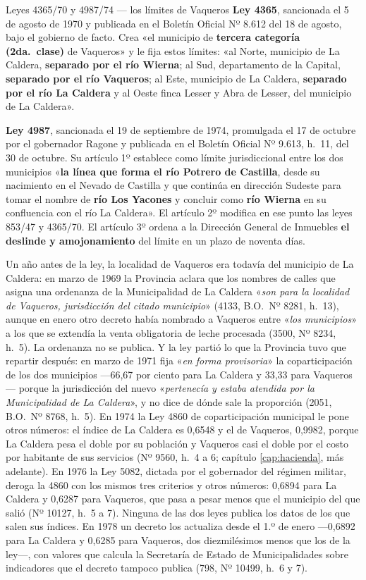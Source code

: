 \begin{ficha}{Leyes 4365/70 y 4987/74 --- los límites de Vaqueros}
\textbf{Ley 4365}, sancionada el 5 de agosto de 1970 y publicada en el Boletín Oficial Nº 8.612 del 18 de agosto, bajo el gobierno de facto. Crea «el municipio de \textbf{tercera categoría (2da.\ clase)} de Vaqueros» y le fija estos límites: «al Norte, municipio de La Caldera, \textbf{separado por el río Wierna}; al Sud, departamento de la Capital, \textbf{separado por el río Vaqueros}; al Este, municipio de La Caldera, \textbf{separado por el río La Caldera} y al Oeste finca Lesser y Abra de Lesser, del municipio de La Caldera».

\textbf{Ley 4987}, sancionada el 19 de septiembre de 1974, promulgada el 17 de octubre por el gobernador Ragone y publicada en el Boletín Oficial Nº 9.613, h.\ 11, del 30 de octubre. Su artículo 1º establece como límite jurisdiccional entre los dos municipios «\textbf{la línea que forma el río Potrero de Castilla}, desde su nacimiento en el Nevado de Castilla y que continúa en dirección Sudeste para tomar el nombre de \textbf{río Los Yacones} y concluir como \textbf{río Wierna} en su confluencia con el río La Caldera». El artículo 2º modifica en ese punto las leyes 853/47 y 4365/70. El artículo 3º ordena a la Dirección General de Inmuebles \textbf{el deslinde y amojonamiento} del límite en un plazo de noventa días.
\end{ficha}

Un año antes de la ley, la localidad de Vaqueros era todavía del municipio de La Caldera: en marzo de 1969 la Provincia aclara que los nombres de calles que asigna una ordenanza de la Municipalidad de La Caldera «\textit{son para la localidad de Vaqueros, jurisdicción del citado municipio}» (4133, B.O.\ Nº 8281, h.\ 13), aunque en enero otro decreto había nombrado a Vaqueros entre «\textit{los municipios}» a los que se extendía la venta obligatoria de leche procesada (3500, Nº 8234, h.\ 5). La ordenanza no se publica. Y la ley partió lo que la Provincia tuvo que repartir después: en marzo de 1971 fija «\textit{en forma provisoria}» la coparticipación de los dos municipios ---66,67 por ciento para La Caldera y 33,33 para Vaqueros--- porque la jurisdicción del nuevo «\textit{pertenecía y estaba atendida por la Municipalidad de La Caldera}», y no dice de dónde sale la proporción (2051, B.O.\ Nº 8768, h.\ 5). En 1974 la Ley 4860 de coparticipación municipal le pone otros números: el índice de La Caldera es 0,6548 y el de Vaqueros, 0,9982, porque La Caldera pesa el doble por su población y Vaqueros casi el doble por el costo por habitante de sus servicios (Nº 9560, h.\ 4 a 6; capítulo \ref{cap:hacienda}, más adelante). En 1976 la Ley 5082, dictada por el gobernador del régimen militar, deroga la 4860 con los mismos tres criterios y otros números: 0,6894 para La Caldera y 0,6287 para Vaqueros, que pasa a pesar menos que el municipio del que salió (Nº 10127, h.\ 5 a 7). Ninguna de las dos leyes publica los datos de los que salen sus índices. En 1978 un decreto los actualiza desde el 1.º de enero ---0,6892 para La Caldera y 0,6285 para Vaqueros, dos diezmilésimos menos que los de la ley---, con valores que calcula la Secretaría de Estado de Municipalidades sobre indicadores que el decreto tampoco publica (798, Nº 10499, h.\ 6 y 7).

